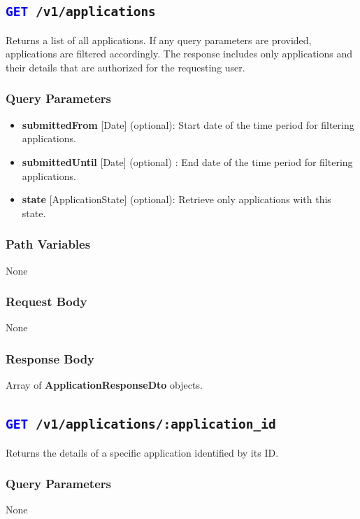 
\subsection{\texttt{\textcolor{blue}{GET} /v1/applications}}

Returns a list of all applications. 
If any query parameters are provided, applications are filtered accordingly. 
The response includes only applications and their details that are authorized for the requesting user. 

\subsubsection{Query Parameters}
\begin{itemize}
    \item \textbf{submittedFrom} [Date] (optional): Start date of the time period for filtering applications.
    \item \textbf{submittedUntil} [Date] (optional) : End date of the time period for filtering applications.
    \item \textbf{state} [ApplicationState] (optional): Retrieve only applications with this state. 
\end{itemize}

\subsubsection{Path Variables}
None

\subsubsection{Request Body}
None

\subsubsection{Response Body}
Array of \textbf{ApplicationResponseDto} objects.


\subsection{\texttt{\textcolor{blue}{GET} /v1/applications/:application\_id }}

Returns the details of a specific application identified by its ID.

\subsubsection{Query Parameters}
None

